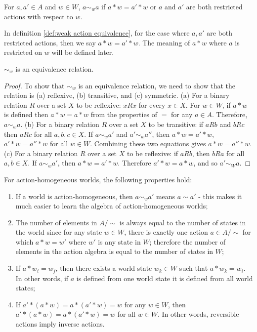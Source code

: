 \begin{definition}\label{def:weak action equivalence}
	For $a,a' \in A$ and $w \in W$, $a \sim_{w} a$ if $a * w = a' * w$ or $a$ and $a'$ are both restricted actions with respect to $w$.
\end{definition}

\begin{remark}
	In definition \ref{def:weak action equivalence}, for the case where $a, a'$ are both restricted actions, then we say $a * w = a' * w$.
	The meaning of $a * w$ where $a$ is restricted on $w$ will be defined later.
\end{remark}

\begin{proposition}
	$\sim_{w}$ is an equivalence relation.
\end{proposition}
\begin{proof}
	To show that $\sim_{w}$ is an equivalence relation, we need to show that the relation is (a) reflexive, (b) transitive, and (c) symmetric.
	(a) For a binary relation $R$ over a set $X$ to be reflexive: $x R x$ for every $x \in X$.
	For $w \in W$, if $a * w$ is defined then $a * w = a * w$ from the properties of $=$ for any $a \in A$.
	Therefore, $a \sim_{w} a$.
	(b) For a binary relation $R$ over a set $X$ to be transitive: if $a R b$ and $b R c$ then $a R c$ for all $a,b,c \in X$.
	If $a \sim_{w} a'$ and $a' \sim_{w} a''$, then $a * w = a' * w$, $a' * w = a'' * w$ for all $w \in W$.
	Combining these two equations gives $a * w = a'' * w$.
	(c) For a binary relation $R$ over a set $X$ to be reflexive: if $a R b$, then $b R a$ for all $a,b \in X$.
	If $a \sim_{w} a'$, then $a * w = a' * w$. Therefore $a' * w = a * w$, and so $a' \sim_{W} a$.
\end{proof}

For action-homogeneous worlds, the following properties hold:
\begin{enumerate}
	\item If a world is action-homogeneous, then $a \sim_{w} a'$ means $a \sim a'$ - this makes it much easier to learn the algebra of action-homogeneous worlds;

	\item The number of elements in $A/\sim$ is always equal to the number of states in the world since for any state $w \in W$, there is exactly one action $a \in A/\sim$ for which $a * w = w'$ where $w'$ is any state in $W$; therefore the number of elements in the action algebra is equal to the number of states in $W$;

	\item If $a * w_{i} = w_{j}$, then there exists a world state $w_{k} \in W$ such that $a * w_{k} = w_{i}$.
	      In other words, if $a$ is defined from one world state it is defined from all world states;

	\item If $a' * (a * w) = a * (a' * w) = w$ for any $w \in W$, then $a' * (a * w) = a * (a' * w) = w$ for all $w \in W$.
	      In other words, reversible actions imply inverse actions.
\end{enumerate}

